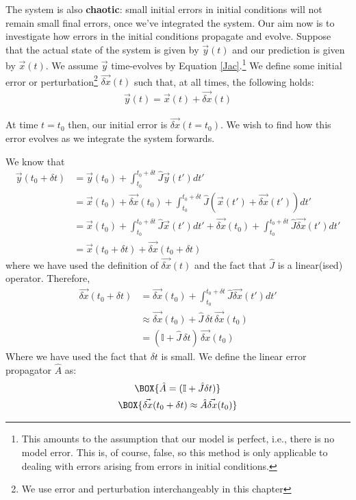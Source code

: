 The system is also \textbf{chaotic}: small initial errors in initial conditions will not remain small final errors, once we've integrated the system. Our aim now is to investigate how errors in the initial conditions propagate and evolve. Suppose that the actual state of the system is given by $\vec{y}(t)$ and our prediction is given by $\vec{x}(t)$. We assume $\vec{y}$ time-evolves by Equation \ref{Jac}.\footnote{This amounts to the assumption that our model is perfect, i.e., there is no model error. This is, of course, false, so this method is only applicable to dealing with errors arising from errors in initial conditions.} We define some initial error or perturbation\footnote{We use error and perturbation interchangeably in this chapter} $\vec{\delta x}(t)$ such that, at all times, the following holds:
\begin{align}
    \vec{y}(t)=\vec{x}(t)+\vec{\delta x}(t)
\end{align}

At time $t=t_0$ then, our initial error is $\vec{\delta x}(t=t_0)$. We wish to find how this error evolves as we integrate the system forwards.

We know that
\begin{align*}
    \vec{y}(t_0+\delta t) & = \vec{y}(t_0) + \int_{t_0}^{t_0+\delta t} \hat{J} \vec{y}(t') dt'\\
    & = \vec{x}(t_0) + \vec{\delta x}(t_0)+ \int_{t_0}^{t_0+\delta t} \hat{J} (\vec{x}(t') + \vec{\delta x}(t')) dt'\\
    & = \vec{x}(t_0) + \int_{t_0}^{t_0+\delta t} \hat{J} \vec{x}(t') dt'+ \vec{\delta x}(t_0)+ \int_{t_0}^{t_0+\delta t} \hat{J} \vec{\delta x}(t') dt'\\
    & = \vec{x}(t_0+\delta t) + \vec{\delta x}(t_0+\delta t)
\end{align*}
where we have used the definition of $\vec{\delta x}(t)$ and the fact that $\hat{J}$ is a linear(ised) operator. Therefore, 
\begin{align*}
    \vec{\delta x}(t_0+\delta t) & = \vec{\delta x}(t_0)+ \int_{t_0}^{t_0+\delta t} \hat{J} \vec{\delta x}(t') dt'\\
    & \approx \vec{\delta x}(t_0)+ \hat{J} \,\delta t\,\vec{\delta x}(t_0)
    \\
    & = (\mathbb{I} + \hat{J}\,\delta t)\,\vec{\delta x}(t_0)
\end{align*}
Where we have used the fact that $\delta t$ is small. We define the linear error propagator $\hat{A}$ as:
\begin{gather}
    \BOX{\hat{A} = (\mathbb{I} + \hat{J}\delta t)}
    \\
    \BOX{\vec{\delta x}(t_0+\delta t)\approx\hat{A}\vec{\delta x}(t_0)} \label{dx}
\end{gather}

